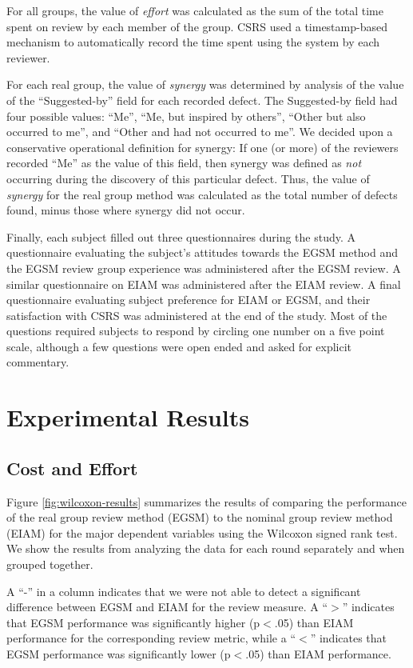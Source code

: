 For all groups, the value of {\em effort} was calculated as the sum of the
total time spent on review by each member of the group.  CSRS used a
timestamp-based mechanism to automatically record the time spent 
using the system by each reviewer. 

For each real group, the value of {\em synergy} was determined by analysis
of the value of the ``Suggested-by'' field for each recorded defect. The
Suggested-by field had four possible values: ``Me'', ``Me, but inspired by
others'', ``Other but also occurred to me'', and ``Other and had not
occurred to me''.  We decided upon a conservative operational definition
for synergy: If one (or more) of the reviewers recorded ``Me'' as the
value of this field, then synergy was defined as {\em not} occurring during the
discovery of this particular defect. Thus, the value of {\em synergy} for 
the real group method was calculated as the total number of defects found, minus
those where synergy did not occur.

Finally, each subject filled out three questionnaires during the study.  A
questionnaire evaluating the subject's attitudes towards the EGSM method
and the EGSM review group experience was administered after the EGSM
review. A similar questionnaire on EIAM was administered after the EIAM
review. A final questionnaire evaluating subject preference for EIAM or
EGSM, and their satisfaction with CSRS was administered at the end of the
study.  Most of the questions required subjects to respond by circling
one number on a five point scale, although a few questions were open ended
and asked for explicit commentary. 


\section{Experimental Results}


\subsection{Cost and Effort}

Figure \ref{fig:wilcoxon-results} summarizes the results of comparing the
performance of the real group review method (EGSM) to the nominal group
review method (EIAM) for the major dependent variables using the Wilcoxon
signed rank test.  We show the results from analyzing the data for each
round separately and when grouped together.

A ``-'' in a column indicates that we were not able to detect a significant
difference between EGSM and EIAM for the review measure. A
``$>$'' indicates that EGSM performance was significantly
higher (p$<$.05) than EIAM performance for the corresponding
review metric, while a ``$<$'' indicates that EGSM performance was
significantly lower (p$<$.05) than EIAM performance.


